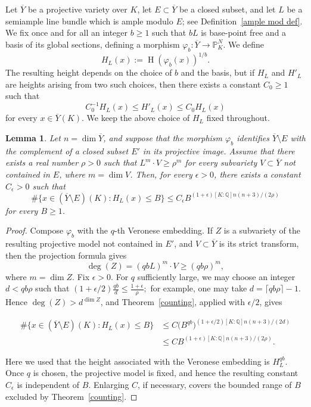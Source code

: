 \documentclass[12 pt]{amsart}
\newtheorem{Lemma}[theorem]{Lemma}
\theoremstyle{definition}
\begin{document}
Let $\overline{Y}$ be a projective variety over $K$, let \(E\subset\overline Y\) be a closed subset, and let \(L\) be a semiample line bundle which is ample modulo \(E\); see Definition~\ref{ample mod def}. We fix once and for all an integer \(b\geq1\) such that \(bL\) is base-point free and a basis of its global sections, defining a morphism
$
\varphi_b:\overline Y\longrightarrow\mathbb P_{K}^N.
$
We define
\[
H_L(x):=\operatorname{H}(\varphi_b(x))^{1/b}.
\]
The resulting height depends on the choice of \(b\) and the basis, but if \(H_L\) and \(H'_L\) are heights arising from two such choices, then there exists a constant \(C_0\geq1\) such that
\[
C_0^{-1}H_L(x)\leq H'_L(x)\leq C_0H_L(x)
\]
for every \(x\in\overline{Y}(K)\). We keep the above choice of \(H_L\) fixed throughout. 
\begin{Lemma}\label{semiample counting}
Let \(n=\dim\overline Y\), and suppose that the morphism \(\varphi_b\) identifies \(\overline Y\setminus E\) with the complement of a closed subset \(E'\) in its projective image. Assume that there exists a real number \(\rho>0\) such that
\(L^m\cdot V\geq\rho^m\) for every subvariety \(V\subset\overline Y\) not contained in \(E\), where \(m=\dim V\). 
Then, for every \(\epsilon>0\), there exists a constant \(C_\epsilon>0\) such that
$$
\#\{x\in(\overline Y\setminus E)(K):H_L(x)\leq B\}
\leq C_\epsilon B^{(1+\epsilon)[K:\mathbb Q]n(n+3)/(2\rho)}
$$
for every \(B\geq1\).


\end{Lemma}
\begin{proof}
Compose \(\varphi_b\) with the \(q\)-th Veronese embedding. If \(Z\) is a subvariety of the resulting projective model not contained in \(E'\), and \(V\subset\overline Y\) is its strict transform, then the projection formula gives
$$
\deg(Z)=(qbL)^m\cdot V\geq(qb\rho)^m,
$$
where \(m=\dim Z\). Fix \(\epsilon>0\). For \(q\) sufficiently large, we may choose an integer \(d<qb\rho\) such that
$(1+\epsilon/2)\frac{qb}{d}\leq\frac{1+\epsilon}{\rho};$ for example, one may take \(d=\lceil qb\rho\rceil-1\). Hence \(\deg(Z)>d^{\dim Z}\), and Theorem~\ref{counting}, applied with \(\epsilon/2\), gives

$$
\begin{aligned}
\#\{x\in(\overline Y\setminus E)(K):H_L(x)\leq B\}
&\leq C\bigl(B^{qb}\bigr)^{(1+\epsilon/2)[K:\mathbb Q]n(n+3)/(2d)}\\
&\leq C B^{(1+\epsilon)[K:\mathbb Q]n(n+3)/(2\rho)}.
\end{aligned}
$$

Here we used that the height associated with the Veronese embedding is \(H_L^{qb}\). Once \(q\) is chosen, the projective model is fixed, and hence the resulting constant \(C_\epsilon\) is independent of \(B\). Enlarging \(C\), if necessary, covers the bounded range of \(B\) excluded by Theorem~\ref{counting}.
\end{proof}
\end{document}
